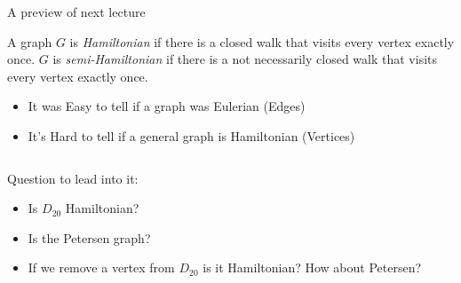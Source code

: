 \documentclass{beamer}
\begin{document}
\begin{frame}{A preview of next lecture}
  \begin{definition}A graph $G$ is \emph{Hamiltonian} if there is a closed walk that visits every vertex exactly once. $G$ is \emph{semi-Hamiltonian} if there is a not necessarily closed walk that visits every vertex exactly once.
  \end{definition}
  \begin{itemize}
     \item It was Easy to tell if a graph was Eulerian (Edges)
     \item It's Hard to tell if a general graph is Hamiltonian (Vertices)
  \end{itemize}
  \begin{columns}
     \begin{column}{.5\textwidth}
        \begin{block}{Question to lead into it:}
          \begin{itemize}
          \item     Is $D_{20}$ Hamiltonian?
          \item Is the Petersen graph?  
\item     If we remove a vertex from $D_{20}$ is it Hamiltonian? How about Petersen?
  \end{itemize}
        \end{block}
     \end{column}
     \begin{column}{.5\textwidth}
\begin{center}    \end{center}
  \end{column}
\end{columns}
\end{frame}
\end{document}

